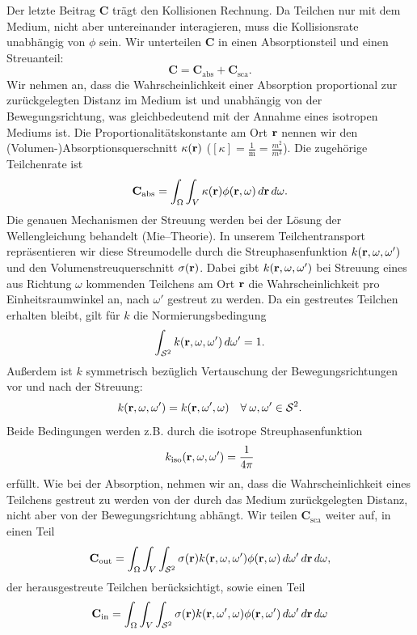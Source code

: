 	Der letzte Beitrag $\mathbf{C}$ trägt den Kollisionen Rechnung. Da Teilchen nur mit dem Medium, nicht aber untereinander interagieren, muss die Kollisionsrate unabhängig von $\phi$ sein. Wir unterteilen $\mathbf{C}$ in einen Absorptionsteil und einen Streuanteil:
	$$\mathbf{C}=\mathbf{C}_\text{abs}+\mathbf{C}_\text{sca}.$$
	Wir nehmen an, dass die Wahrscheinlichkeit einer Absorption proportional zur zurückgelegten Distanz im Medium ist und unabhängig von der Bewegungsrichtung, was gleichbedeutend mit der Annahme eines isotropen Mediums ist. Die Proportionalitätskonstante am Ort $\mathbf{r}$ nennen wir den (Volumen-)Absorptionsquerschnitt $\kappa(\mathbf{r})$ ($[\kappa]=\frac{1}{\text{m}}=\frac{m^2}{m^3}$). Die zugehörige Teilchenrate ist
	$$\mathbf{C}_\text{abs}=\int_\Omega \int_V \kappa(\mathbf{r})\phi(\mathbf{r},\omega)\,d\mathbf{r}\,d\omega.$$
	Die genauen Mechanismen der Streuung werden bei der Lösung der Wellengleichung behandelt (Mie--Theorie). In unserem Teilchentransport repräsentieren wir diese Streumodelle durch die Streuphasenfunktion $k(\mathbf{r},\omega,\omega')$ und den Volumenstreuquerschnitt $\sigma(\mathbf{r})$. Dabei gibt $k(\mathbf{r},\omega,\omega')$ bei Streuung eines aus Richtung $\omega$ kommenden Teilchens am Ort $\mathbf{r}$ die Wahrscheinlichkeit pro Einheitsraumwinkel an, nach $\omega'$ gestreut zu werden. Da ein gestreutes Teilchen erhalten bleibt, gilt für $k$ die Normierungsbedingung
	\begin{equation}\label{eq:k_norm_req}
	  \int_{\mathcal{S}^2} k(\mathbf{r},\omega,\omega')\,d\omega'=1.
	\end{equation}
	Außerdem ist $k$ symmetrisch bezüglich Vertauschung der Bewegungsrichtungen vor und nach der Streuung:
	$$k(\mathbf{r},\omega,\omega')=k(\mathbf{r},\omega',\omega)\quad \forall\:\omega,\omega'\in\mathcal{S}^2.$$
	Beide Bedingungen werden z.B. durch die isotrope Streuphasenfunktion $$k_\text{iso}(\mathbf{r},\omega,\omega')=\frac{1}{4\pi}$$ erfüllt.
	Wie bei der Absorption, nehmen wir an, dass die Wahrscheinlichkeit eines Teilchens gestreut zu werden von der durch das Medium zurückgelegten Distanz, nicht aber von der Bewegungsrichtung abhängt. Wir teilen $\mathbf{C}_\text{sca}$ weiter auf, in einen Teil
	$$\mathbf{C}_\text{out}=\int_\Omega \int_V \int_{\mathcal{S}^2} \sigma{(\mathbf{r})}k(\mathbf{r},\omega,\omega')\phi(\mathbf{r},\omega)\,d\omega'\,d\mathbf{r}\,d\omega,$$
	der herausgestreute Teilchen berücksichtigt, sowie einen Teil
	$$\mathbf{C}_\text{in}=\int_\Omega \int_V \int_{\mathcal{S}^2} \sigma{(\mathbf{r})}k(\mathbf{r},\omega',\omega)\phi(\mathbf{r},\omega')\,d\omega'\,d\mathbf{r}\,d\omega$$
